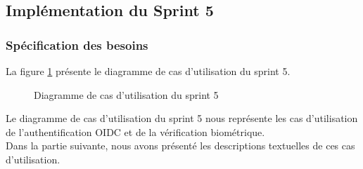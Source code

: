 \subsection{Implémentation du Sprint 5}

\subsubsection{Spécification des besoins}
La figure \ref{fig:UseCaseDiagramSp51} présente le diagramme de cas d'utilisation du sprint 5.

\begin{figure}[H]
  \centering
  \caption{Diagramme de cas d'utilisation du sprint 5}
  \label{fig:UseCaseDiagramSp51}
\end{figure}

Le diagramme de cas d'utilisation du sprint 5 nous représente les cas d'utilisation de l'authentification OIDC et de la vérification biométrique.\\

Dans la partie suivante, nous avons présenté les descriptions textuelles de ces cas d'utilisation.


